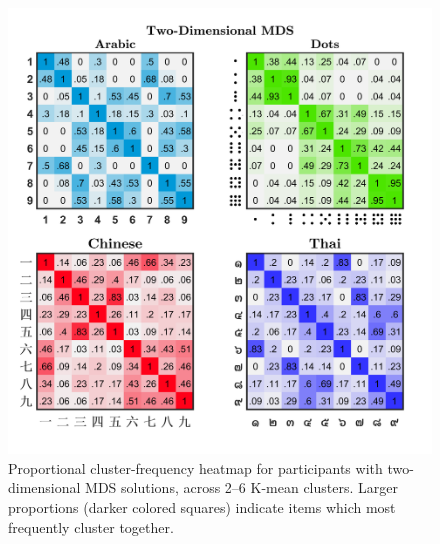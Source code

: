\begin{figure}[tbh]
\centering \includegraphics[scale = .7]{Figures/Appendix/AppD/2D_KM2clusterHeatmapCustom_wDots.jpg}
\caption{Proportional cluster-frequency heatmap for participants with two-dimensional MDS solutions, across 2--6 K-mean clusters. Larger proportions (darker colored squares) indicate items which most frequently cluster together.}
\label{fig:Apx_2D_MDScounts}
\end{figure}

